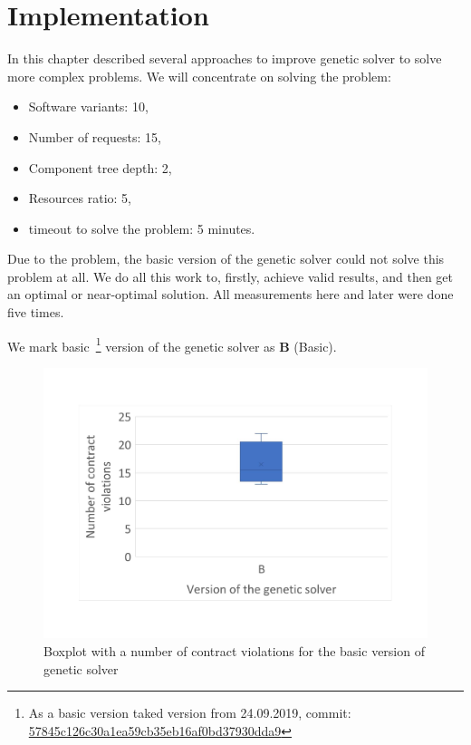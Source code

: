 \chapter{Implementation}\label{chapter:Implementation}

In this chapter described several approaches to improve genetic solver to solve more complex problems.
We will concentrate on solving the problem:

\begin{itemize}
	\item Software variants: 10,
	\item Number of requests: 15,
	\item Component tree depth: 2,
	\item Resources ratio: 5,
	\item timeout to solve the problem: 5 minutes.
\end{itemize}

Due to the problem, the basic version of the genetic solver could not solve this problem at all. We do all this work to, firstly, achieve valid results, and then get an optimal or near-optimal solution. 
All measurements here and later were done five times.


We mark basic~\footnote{As a basic version taked version from 24.09.2019, commit: \href{https://git-st.inf.tu-dresden.de/mquat/mquat2/commit/57845c126c30a1ea59cb35eb16af0bd37930dda9}{57845c126c30a1ea59cb35eb16af0bd37930dda9}} version of the genetic solver as \textbf{B} (Basic).


\begin{figure}
	\centering
	\includegraphics[width=\textwidth]{images/BoxPlotSolverBasic}
	\caption[Boxplot with a number of contract violations for the basic version of genetic solver]{Boxplot with a number of contract violations for the basic version of genetic solver}
	\label{fig:boxplotsolverbasic}
\end{figure}


